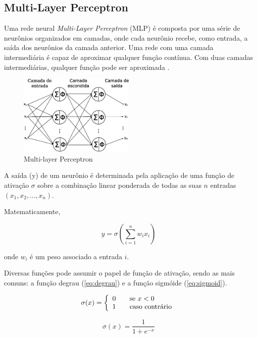 \subsection{Multi-Layer Perceptron}

Uma rede neural \textit{Multi-Layer Perceptron} (MLP) é composta por uma série de neurônios organizados em camadas, onde cada neurônio recebe, como entrada, a saída dos neurônios da camada anterior. Uma rede com uma camada intermediária é capaz de aproximar qualquer função contínua. Com duas camadas intermediárias, qualquer função pode ser aproximada \cite{cybenko1989mlp}.

\begin{figure}[H]
    \centering
    \includegraphics[width=0.5\textwidth]{figures/mlp}
    \caption{Multi-layer Perceptron}
    \label{fig:mlp}
\end{figure}

A saída (y) de um neurônio é determinada pela aplicação de uma função de ativação \(\sigma\) sobre a combinação linear ponderada de todas as suas \(n\) entradas \((x_1, x_2, \dots , x_n)\).

Matematicamente,

\[ y = \sigma ( \sum_{i=1}^{n} w_i x_i ) \]

onde \(w_i\) é um peso associado a entrada \(i\).

Diversas funções pode assumir o papel de função de ativação, sendo as mais comuns:
a função degrau (\ref{eq:degrau}) e a função sigmóide (\ref{eq:sigmoid}).

\begin{equation} \label{eq:degrau}
    \sigma (x) = \left\{
    \begin{array}{l l}
        0 & \quad \text{se } x < 0\\
        1 & \quad \text{caso contrário}
    \end{array} \right.
\end{equation}

\begin{equation} \label{eq:sigmoid}
    \sigma (x) = \frac{1}{1 + e^{-x}}
\end{equation}

